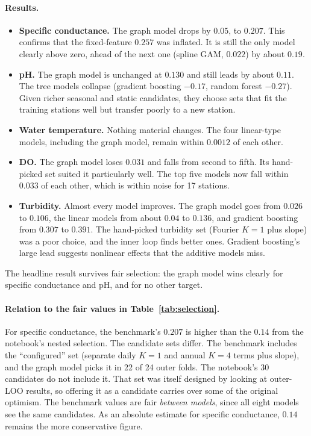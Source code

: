 \documentclass[11pt]{article}
\begin{document}
\paragraph{Results.}
\begin{itemize}
  \item \textbf{Specific conductance.} The graph model drops by $0.05$, to $0.207$. This confirms that
        the fixed-feature $0.257$ was inflated. It is still the only model clearly above zero, ahead
        of the next one (spline GAM, $0.022$) by about $0.19$.
  \item \textbf{pH.} The graph model is unchanged at $0.130$ and still leads by about $0.11$. The tree
        models collapse (gradient boosting $-0.17$, random forest $-0.27$). Given richer seasonal and
        static candidates, they choose sets that fit the training stations well but transfer poorly to a
        new station.
  \item \textbf{Water temperature.} Nothing material changes. The four linear-type models, including
        the graph model, remain within $0.0012$ of each other.
  \item \textbf{DO.} The graph model loses $0.031$ and falls from second to fifth. Its hand-picked set
        suited it particularly well. The top five models now fall within $0.033$ of each other, which
        is within noise for 17 stations.
  \item \textbf{Turbidity.} Almost every model improves. The graph model goes from $0.026$ to $0.106$,
        the linear models from about $0.04$ to $0.136$, and gradient boosting from $0.307$ to $0.391$.
        The hand-picked turbidity set (Fourier $K=1$ plus slope) was a poor choice, and the inner loop
        finds better ones. Gradient boosting's large lead suggests nonlinear effects that the
        additive models miss.
\end{itemize}

The headline result survives fair selection: the graph model wins clearly for specific conductance
and pH, and for no other target.

\paragraph{Relation to the fair values in Table~\ref{tab:selection}.} For specific conductance, the
benchmark's $0.207$ is higher than the $0.14$ from the notebook's nested selection. The candidate sets
differ. The benchmark includes the ``configured'' set (separate daily $K=1$ and annual $K=4$ terms plus
slope), and the graph model picks it in 22 of 24 outer folds. The notebook's 30 candidates do not
include it. That set was itself designed by looking at outer-LOO results, so offering it as a
candidate carries over some of the original optimism. The benchmark values are fair \emph{between
models}, since all eight models see the same candidates. As an absolute estimate for specific
conductance, $0.14$ remains the more conservative figure.
\end{document}
